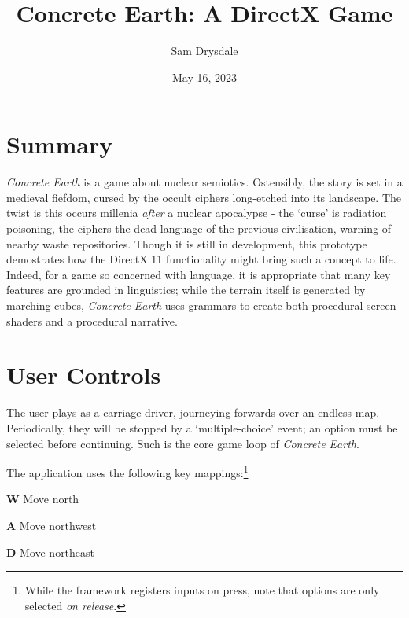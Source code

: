 \documentclass[a4paper, 11pt]{article}
\title{Concrete Earth: A DirectX Game}
\author{Sam Drysdale}
\date{May 16, 2023}
\begin{document}
\graphicspath{{./Images/}}
\maketitle
\tableofcontents
\begin{flushleft}

\section{Summary}

\textit{Concrete Earth} is a game about nuclear semiotics. Ostensibly, the story is set in a medieval fiefdom, cursed by the occult ciphers long-etched into its landscape. The twist is this occurs millenia \textit{after} a nuclear apocalypse - the `curse' is radiation poisoning, the ciphers the dead language of the previous civilisation, warning of nearby waste repositories. Though it is still in development, this prototype demostrates how the DirectX 11 functionality might bring such a concept to life. Indeed, for a game so concerned with language, it is appropriate that many key features are grounded in linguistics; while the terrain itself is generated by marching cubes, \textit{Concrete Earth} uses grammars to create both procedural screen shaders and a procedural narrative.



\section{User Controls}

The user plays as a carriage driver, journeying forwards over an endless map. Periodically, they will be stopped by a `multiple-choice' event; an option must be selected before continuing. Such is the core game loop of \textit{Concrete Earth}.

\vspace{5pt}\noindent
The application uses the following key mappings:\footnote{While the framework registers inputs on press, note that options are only selected \textit{on release}.}

\begin{center}
\parbox[t]{0.75\textwidth}{
\vspace{0pt}\noindent 
\textbf{W} \dotfill{} Move north

\vspace{2.5pt}\noindent 
\textbf{A} \dotfill{} Move northwest

\vspace{2.5pt}\noindent 
\textbf{D} \dotfill{} Move northeast

}
\end{center}
\end{flushleft}
\end{document}
